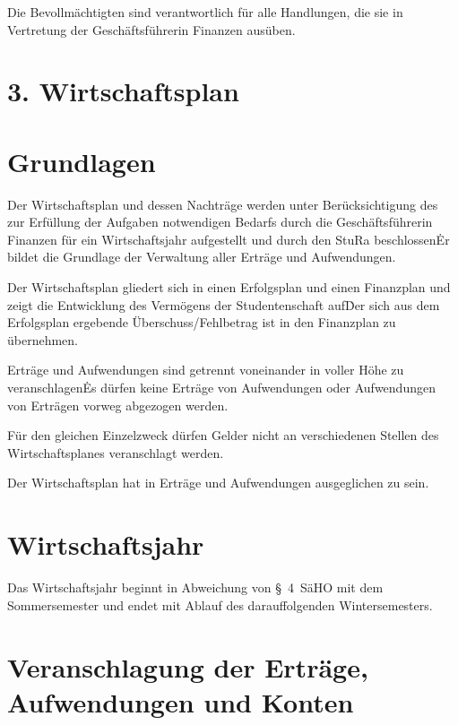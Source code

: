 \begin{multicols}{2}
\Abs \Satz Die Bevollmächtigten sind verantwortlich für alle Handlungen, die sie in Vertretung der Geschäftsführerin Finanzen ausüben.


\section*{3. Wirtschaftsplan}



\section{Grundlagen}

\Abs \Satz Der Wirtschaftsplan und dessen Nachträge werden unter Berücksichtigung des zur Erfüllung der Aufgaben notwendigen Bedarfs durch die Geschäftsführerin Finanzen für ein Wirtschaftsjahr aufgestellt und durch den StuRa beschlossen\. Er bildet die Grundlage der Verwaltung aller Erträge und Aufwendungen.

\Abs \Satz Der Wirtschaftsplan gliedert sich in einen Erfolgsplan und einen Finanzplan und zeigt die Entwicklung des Vermögens der Studentenschaft auf\. Der sich aus dem Erfolgsplan ergebende Überschuss/Fehlbetrag ist in den Finanzplan zu übernehmen.

\Abs \Satz Erträge und Aufwendungen sind getrennt voneinander in voller Höhe zu veranschlagen\. Es dürfen keine Erträge von Aufwendungen oder Aufwendungen von Erträgen vorweg abgezogen werden.

\Abs \Satz Für den gleichen Einzelzweck dürfen Gelder nicht an verschiedenen Stellen des Wirtschaftsplanes veranschlagt werden.

\Abs \Satz Der Wirtschaftsplan hat in Erträge und Aufwendungen ausgeglichen zu sein.



\section{Wirtschaftsjahr}

\Abs \Satz Das Wirtschaftsjahr beginnt in Abweichung von §~4~SäHO mit dem Sommersemester und endet mit Ablauf des darauffolgenden Wintersemesters.



\section{Veranschlagung der Erträge, Aufwendungen und Konten}


\end{multicols}
